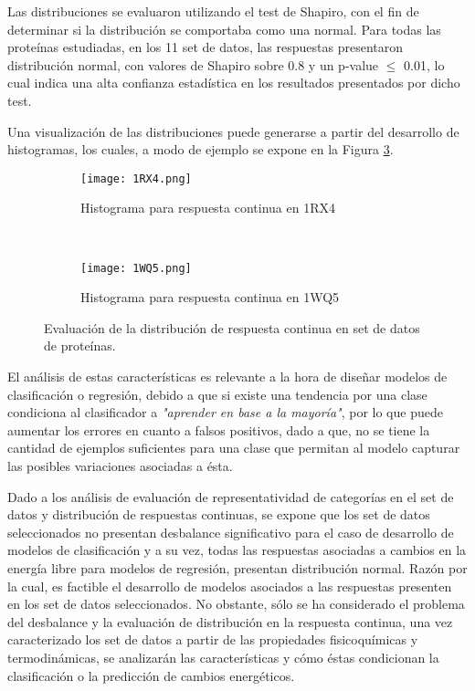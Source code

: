 Las distribuciones se evaluaron utilizando el test de Shapiro, con el fin de determinar si la distribución se comportaba como una normal. Para todas las proteínas estudiadas, en los 11 set de datos, las respuestas presentaron distribución normal, con valores de Shapiro sobre 0.8 y un p-value $\leq$ 0.01, lo cual indica una alta confianza estadística en los resultados presentados por dicho test.

Una visualización de las distribuciones puede generarse a partir del desarrollo de histogramas, los cuales, a modo de ejemplo se expone en la Figura \ref{fig:histogram}.

\begin{figure}[!h]
	\centering
	\begin{subfigure}{0.48\textwidth}
		\texttt{[image: 1RX4.png]}
		\caption{Histograma para respuesta continua en 1RX4}
		\label{fig:hist1}
	\end{subfigure}
	~ %
	\begin{subfigure}{0.48\textwidth}
		\texttt{[image: 1WQ5.png]}
		\caption{Histograma para respuesta continua en 1WQ5}
		\label{fig:hist2}
	\end{subfigure}
	
	\caption{Evaluación de la distribución de respuesta continua en set de datos de proteínas.}
	\label{fig:histogram}
\end{figure}

El análisis de estas características es relevante a la hora de diseñar modelos de clasificación o regresión, debido a que si existe una tendencia por una clase condiciona al clasificador a \textit{"aprender en base a la mayoría"}, por lo que puede aumentar los errores en cuanto a falsos positivos, dado a que, no se tiene la cantidad de ejemplos suficientes para una clase que permitan al modelo capturar las posibles variaciones asociadas a ésta.

Dado a los análisis de evaluación de representatividad de categorías en el set de datos y distribución de respuestas continuas, se expone que los set de datos seleccionados no presentan desbalance significativo para el caso de desarrollo de modelos de clasificación y a su vez, todas las respuestas asociadas a cambios en la energía libre para modelos de regresión, presentan distribución normal. Razón por la cual, es factible el desarrollo de modelos asociados a las respuestas presenten en los set de datos seleccionados. No obstante, sólo se ha considerado el problema del desbalance y la evaluación de distribución en la respuesta continua, una vez caracterizado los set de datos a partir de las propiedades fisicoquímicas y termodinámicas, se analizarán las características y cómo éstas condicionan la clasificación o la predicción de cambios energéticos.

